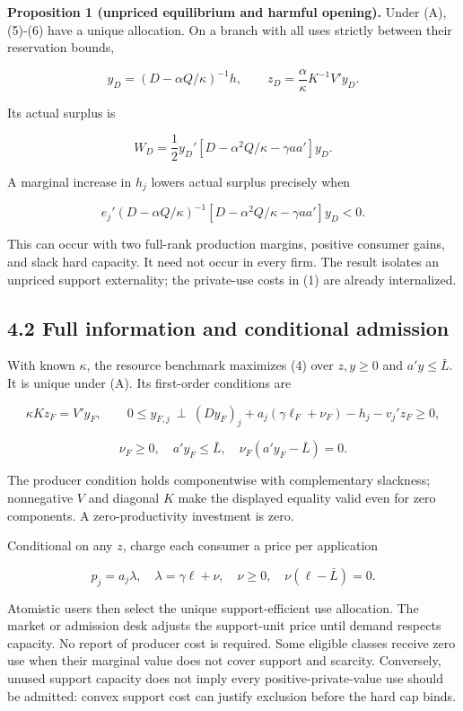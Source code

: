 \documentclass[
  11pt,
]{article}
\begin{document}
\textbf{Proposition 1 (unpriced equilibrium and harmful opening).} Under
(A), (5)-(6) have a unique allocation. On a branch with all uses
strictly between their reservation bounds,

\[y_D=(D-\alpha Q/\kappa)^{-1}h,\qquad
z_D=\frac\alpha\kappa K^{-1}V'y_D. \tag{7}\]

Its actual surplus is

\[W_D=\frac12y_D'[D-\alpha^2Q/\kappa-\gamma aa']y_D. \tag{8}\]

A marginal increase in \(h_j\) lowers actual surplus precisely when

\[e_j'(D-\alpha Q/\kappa)^{-1}
[D-\alpha^2Q/\kappa-\gamma aa']y_D<0. \tag{9}\]

This can occur with two full-rank production margins, positive consumer
gains, and slack hard capacity. It need not occur in every firm. The
result isolates an unpriced support externality; the private-use costs
in (1) are already internalized.

\subsection{4.2 Full information and conditional
admission}\label{full-information-and-conditional-admission}

With known \(\kappa\), the resource benchmark maximizes (4) over
\(z,y\geq0\) and \(a'y\leq\bar L\). It is unique under (A). Its
first-order conditions are

\[\kappa Kz_F=V'y_F,\qquad
0\leq y_{F,j}\ \perp\ (Dy_F)_j+a_j(\gamma\ell_F+\nu_F)-h_j-v_j'z_F\geq0, \tag{10}\]

\[\nu_F\geq0,\quad a'y_F\leq\bar L,\quad
\nu_F(a'y_F-\bar L)=0. \tag{11}\]

The producer condition holds componentwise with complementary slackness;
nonnegative \(V\) and diagonal \(K\) make the displayed equality valid
even for zero components. A zero-productivity investment is zero.

Conditional on any \(z\), charge each consumer a price per application

\[p_j=a_j\lambda,\quad \lambda=\gamma\ell+\nu,\quad
\nu\geq0,\quad \nu(\ell-\bar L)=0. \tag{12}\]

Atomistic users then select the unique support-efficient use allocation.
The market or admission desk adjusts the support-unit price until demand
respects capacity. No report of producer cost is required. Some eligible
classes receive zero use when their marginal value does not cover
support and scarcity. Conversely, unused support capacity does not imply
every positive-private-value use should be admitted: convex support cost
can justify exclusion before the hard cap binds.
\end{document}
